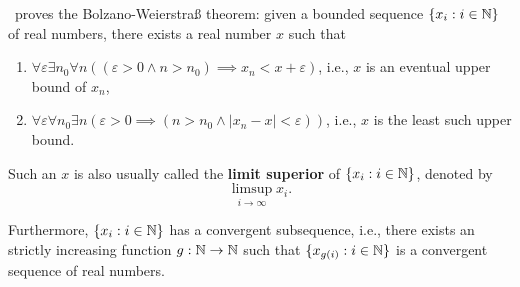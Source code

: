 \documentclass[../main.tex]{memoir}
\begin{document}
\begin{theorem}
  \label{thm:aca-bw}
  \aca\ proves the Bolzano-Weierstra{\ss} theorem: given a bounded sequence $\{x_i: i \in \mathbb{N}\}$ of real numbers, there exists a real number $x$ such that

  \begin{enumerate}
  \item $\forall \varepsilon \exists n_0 \forall n ((\varepsilon > 0 \land n > n_0) \implies x_n < x + \varepsilon)$, i.e., $x$ is an eventual upper bound of $x_n$,
  \item $\forall \varepsilon \forall n_0 \exists n (\varepsilon > 0 \implies (n > n_0 \land |x_n - x| < \varepsilon))$, i.e., $x$ is the least such upper bound.
  \end{enumerate}

  Such an $x$ is also usually called the \textbf{limit superior} of $\{x_i: i \in \mathbb{N}\}$, denoted by
  \[ \limsup_{i \to \infty} x_i. \]

  Furthermore, $\{x_i: i \in \mathbb{N}\}$ has a convergent subsequence, i.e., there exists an strictly increasing function $g: \mathbb{N} \to \mathbb{N}$ such that $\{x_{g(i)}: i \in \mathbb{N}\}$ is a convergent sequence of real numbers.
\end{theorem}
\end{document}
